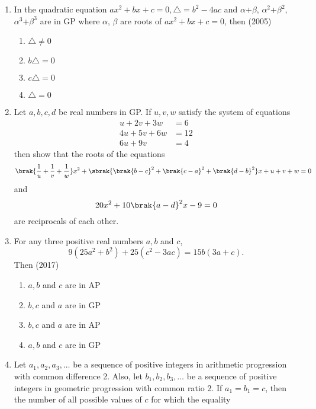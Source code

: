 \begin{enumerate}[label=\thesubsection.\arabic*,ref=\thesubsection.\theenumi]
\begin{multicols}{4}
\begin{enumerate}
            \end{enumerate}
            \end{multicols}
\item In the quadratic equation $ax^2+bx+c=0, \triangle=b^2-4ac$ and $\alpha$+$\beta$, $\alpha^2$+$\beta^2$, $\alpha^3$+$\beta^3$ are in GP where $\alpha$, $\beta $ are roots of $ax^2+bx+c=0$, then \hfill(2005)
                \begin{multicols}{4}
\begin{enumerate}    
                    \item $\triangle\neq0$
                    \item $b\triangle=0$
                    \item $c\triangle=0$
                    \item $\triangle=0$
                \end{enumerate}
                \end{multicols}
      \item  Let $ a, b, c, d $ be real numbers in GP. If $u, v, w$ satisfy the system of equations  
%    
	      \hfill {}
%      
\begin{align*}
	u+2v+3w&=6  
	  \\
	  4u+5v+6w&=12 
	  \\
	  6u+9v&=4 
\end{align*}
      then show that the roots of the equations 
		$$\brak{\frac{1}{u}+\frac{1}{v}+\frac{1}{w}}x^{2}+\sbrak{\brak{b-c}^{2}+\brak{c-a}^{2}+\brak{d-b}^{2}}x+u+v+w=0 $$ and $$ 20x^{2}+10\brak{a-d}^{2}x-9=0 $$ are reciprocals of each other.
 \item For any three positive real numbers $a, b$ and $c$,  $$9(25a^2+b^2)+ 25(c^2-3ac) = 15b(3a+c).$$ Then \hfill (2017)
	 \begin{multicols}{2}
\begin{enumerate}    
  \item$a, b$ and $c$ are in AP
  \item{$b, c$ and $a$ are in GP}
  \columnbreak
  \item $b, c$ and $a$ are in AP
  \item{$a, b$ and $c$ are in GP}
  \end{enumerate}
  \end{multicols}
\item       Let $a_1, a_2, a_3, \dots $ be a sequence of positive integers in arithmetic progression with common difference 2. Also, let $b_1, b_2, b_3, \dots $ be a sequence of positive integers in geometric progression with common ratio 2. If $a_1 = b_1 = c$, then the number of all possible values of $c$ for which the equality 


\end{enumerate}
